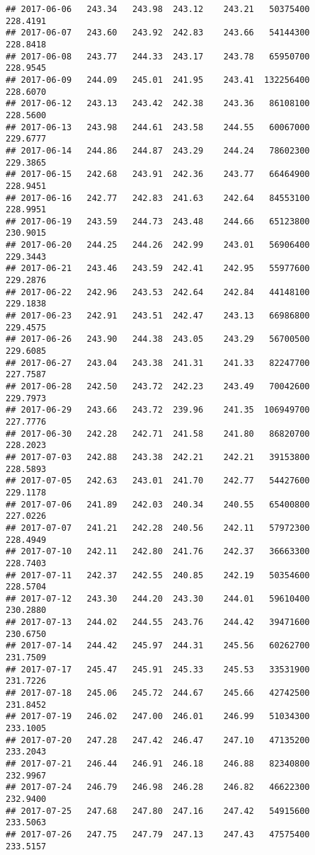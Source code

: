 \documentclass[
]{article}
\begin{document}
\begin{verbatim}
## 2017-06-06   243.34   243.98  243.12    243.21   50375400     228.4191
## 2017-06-07   243.60   243.92  242.83    243.66   54144300     228.8418
## 2017-06-08   243.77   244.33  243.17    243.78   65950700     228.9545
## 2017-06-09   244.09   245.01  241.95    243.41  132256400     228.6070
## 2017-06-12   243.13   243.42  242.38    243.36   86108100     228.5600
## 2017-06-13   243.98   244.61  243.58    244.55   60067000     229.6777
## 2017-06-14   244.86   244.87  243.29    244.24   78602300     229.3865
## 2017-06-15   242.68   243.91  242.36    243.77   66464900     228.9451
## 2017-06-16   242.77   242.83  241.63    242.64   84553100     228.9951
## 2017-06-19   243.59   244.73  243.48    244.66   65123800     230.9015
## 2017-06-20   244.25   244.26  242.99    243.01   56906400     229.3443
## 2017-06-21   243.46   243.59  242.41    242.95   55977600     229.2876
## 2017-06-22   242.96   243.53  242.64    242.84   44148100     229.1838
## 2017-06-23   242.91   243.51  242.47    243.13   66986800     229.4575
## 2017-06-26   243.90   244.38  243.05    243.29   56700500     229.6085
## 2017-06-27   243.04   243.38  241.31    241.33   82247700     227.7587
## 2017-06-28   242.50   243.72  242.23    243.49   70042600     229.7973
## 2017-06-29   243.66   243.72  239.96    241.35  106949700     227.7776
## 2017-06-30   242.28   242.71  241.58    241.80   86820700     228.2023
## 2017-07-03   242.88   243.38  242.21    242.21   39153800     228.5893
## 2017-07-05   242.63   243.01  241.70    242.77   54427600     229.1178
## 2017-07-06   241.89   242.03  240.34    240.55   65400800     227.0226
## 2017-07-07   241.21   242.28  240.56    242.11   57972300     228.4949
## 2017-07-10   242.11   242.80  241.76    242.37   36663300     228.7403
## 2017-07-11   242.37   242.55  240.85    242.19   50354600     228.5704
## 2017-07-12   243.30   244.20  243.30    244.01   59610400     230.2880
## 2017-07-13   244.02   244.55  243.76    244.42   39471600     230.6750
## 2017-07-14   244.42   245.97  244.31    245.56   60262700     231.7509
## 2017-07-17   245.47   245.91  245.33    245.53   33531900     231.7226
## 2017-07-18   245.06   245.72  244.67    245.66   42742500     231.8452
## 2017-07-19   246.02   247.00  246.01    246.99   51034300     233.1005
## 2017-07-20   247.28   247.42  246.47    247.10   47135200     233.2043
## 2017-07-21   246.44   246.91  246.18    246.88   82340800     232.9967
## 2017-07-24   246.79   246.98  246.28    246.82   46622300     232.9400
## 2017-07-25   247.68   247.80  247.16    247.42   54915600     233.5063
## 2017-07-26   247.75   247.79  247.13    247.43   47575400     233.5157

\end{verbatim}
\end{document}

